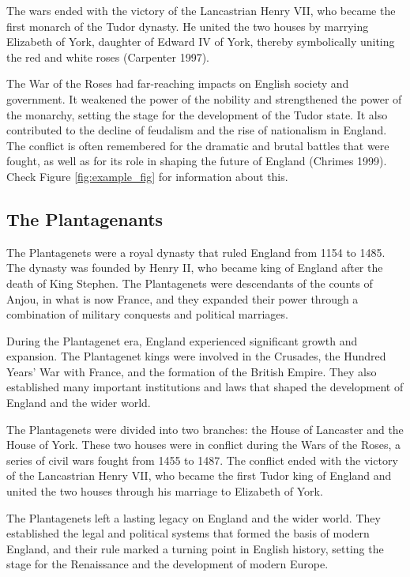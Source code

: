 \documentclass[11pt,article,oneside]{memoir}
\begin{document}
The wars ended with the victory of the Lancastrian Henry VII, who became
the first monarch of the Tudor dynasty. He united the two houses by
marrying Elizabeth of York, daughter of Edward IV of York, thereby
symbolically uniting the red and white roses (Carpenter 1997).

The War of the Roses had far-reaching impacts on English society and
government. It weakened the power of the nobility and strengthened the
power of the monarchy, setting the stage for the development of the
Tudor state. It also contributed to the decline of feudalism and the
rise of nationalism in England. The conflict is often remembered for the
dramatic and brutal battles that were fought, as well as for its role in
shaping the future of England (Chrimes 1999). Check Figure
\ref{fig:example_fig} for information about this.

\hypertarget{the-plantagenants}{%
\subsection{The Plantagenants}\label{the-plantagenants}}

The Plantagenets were a royal dynasty that ruled England from 1154 to
1485. The dynasty was founded by Henry II, who became king of England
after the death of King Stephen. The Plantagenets were descendants of
the counts of Anjou, in what is now France, and they expanded their
power through a combination of military conquests and political
marriages.

During the Plantagenet era, England experienced significant growth and
expansion. The Plantagenet kings were involved in the Crusades, the
Hundred Years' War with France, and the formation of the British Empire.
They also established many important institutions and laws that shaped
the development of England and the wider world.

The Plantagenets were divided into two branches: the House of Lancaster
and the House of York. These two houses were in conflict during the Wars
of the Roses, a series of civil wars fought from 1455 to 1487. The
conflict ended with the victory of the Lancastrian Henry VII, who became
the first Tudor king of England and united the two houses through his
marriage to Elizabeth of York.

The Plantagenets left a lasting legacy on England and the wider world.
They established the legal and political systems that formed the basis
of modern England, and their rule marked a turning point in English
history, setting the stage for the Renaissance and the development of
modern Europe.
\end{document}
